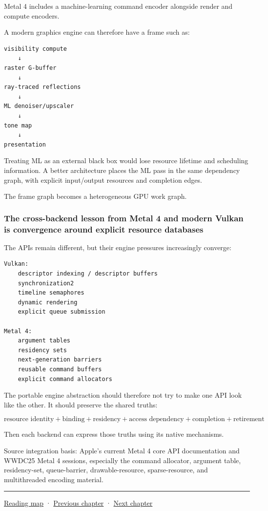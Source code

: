 Metal 4 includes a machine-learning command encoder alongside render and compute encoders.

A modern graphics engine can therefore have a frame such as:

\begin{verbatim}
visibility compute
    ↓
raster G-buffer
    ↓
ray-traced reflections
    ↓
ML denoiser/upscaler
    ↓
tone map
    ↓
presentation
\end{verbatim}

Treating ML as an external black box would lose resource lifetime and scheduling information. A better architecture places the ML pass in the same dependency graph, with explicit input/output resources and completion edges.

The frame graph becomes a heterogeneous GPU work graph.

\subsubsection{The cross-backend lesson from Metal 4 and modern Vulkan is convergence around explicit resource databases}\label{05-engine-i-ch022-the-cross-backend-lesson-from-metal-4-and-modern-vulkan-is-convergence-around-explicit-resource-databases}

The APIs remain different, but their engine pressures increasingly converge:

\begin{verbatim}
Vulkan:
    descriptor indexing / descriptor buffers
    synchronization2
    timeline semaphores
    dynamic rendering
    explicit queue submission

Metal 4:
    argument tables
    residency sets
    next-generation barriers
    reusable command buffers
    explicit command allocators
\end{verbatim}

The portable engine abstraction should therefore not try to make one API look like the other. It should preserve the shared truths:

\[
\boxed{
\text{resource identity}
+
\text{binding}
+
\text{residency}
+
\text{access dependency}
+
\text{completion}
+
\text{retirement}
}
\]

Then each backend can express those truths using its native mechanisms.

Source integration basis: Apple's current Metal 4 core API documentation and WWDC25 Metal 4 sessions, especially the command allocator, argument table, residency-set, queue-barrier, drawable-resource, sparse-resource, and multithreaded encoding material.

\begin{center}\rule{0.5\linewidth}{0.5pt}\end{center}

\hyperref[volume-reading-map]{Reading map} · \hyperref[05-engine-i-ch021-buffers-images-memory-and-uploads]{Previous chapter} · \hyperref[05-engine-i-ch023-execute-and-measure-a-metal-frame]{Next chapter}

